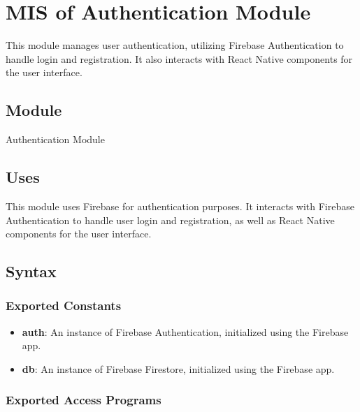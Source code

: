 \documentclass[12pt, titlepage]{article}
\begin{document}
\newpage


\section{MIS of Authentication Module}\label{Authentication_Module}
This module manages user authentication, utilizing Firebase Authentication to handle login and registration. It also interacts with React Native components for the user interface.

\subsection{Module}

Authentication Module

\subsection{Uses}
This module uses Firebase for authentication purposes. It interacts with
Firebase Authentication to handle user login and registration, as well as React
Native components for the user interface.

\subsection{Syntax}

\subsubsection{Exported Constants}

\begin{itemize}
    \item \textbf{auth}: An instance of Firebase Authentication, initialized using the Firebase app.
    \item \textbf{db}: An instance of Firebase Firestore, initialized using the Firebase app.
\end{itemize}

\subsubsection{Exported Access Programs}
\end{document}
